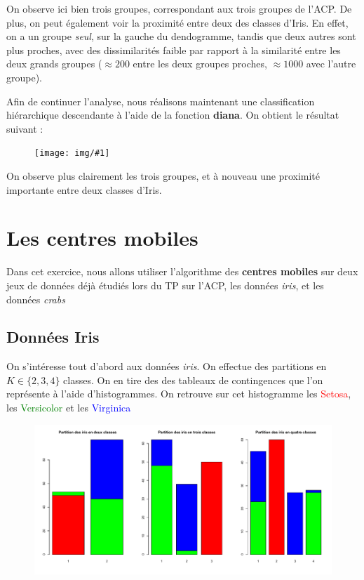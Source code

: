 \documentclass[a4paper,11pt]{article}
\newcommand{\InsertFig}[1]{
\begin{figure}[H]
\begin{center}
\texttt{[image: img/\#1]}
\end{center}
\end{figure}}
\begin{document}
\noindent On observe ici bien trois groupes, correspondant aux trois groupes de l'ACP. De plus, on peut également voir la proximité entre deux des classes d'Iris. En effet,  on a un groupe \textit{seul}, sur la gauche du dendogramme, tandis que deux autres sont plus proches, avec des dissimilarités faible par rapport à la similarité entre les deux grands groupes ($\approx 200$ entre les deux groupes proches, $\approx 1000$ avec l'autre groupe).

\noindent Afin de continuer l'analyse, nous réalisons maintenant une classification hiérarchique descendante à l'aide de la fonction \textbf{diana}. On obtient le résultat suivant : 


\InsertFig{dendodiana}

\noindent On observe plus clairement les trois groupes, et à nouveau une proximité importante entre deux classes d'Iris.

\section{Les centres mobiles}

\noindent Dans cet exercice, nous allons utiliser l'algorithme des \textbf{centres mobiles} sur deux jeux de données déjà étudiés lors du TP sur l'ACP, les données \textit{iris}, et les données \textit{crabs}

\subsection{Données Iris}

\noindent On s'intéresse tout d'abord aux données \textit{iris}. On effectue des partitions en $K \in \{2,3,4\}$ classes. On en tire des des tableaux de contingences que l'on représente à l'aide d'histogrammes. On retrouve sur cet histogramme les \textcolor{red}{Setosa}, les \textcolor{green}{Versicolor} et les \textcolor{blue}{Virginica}

\begin{figure}[H]
\begin{center}
\includegraphics[width=\textwidth]{img/partiris}
\end{center}
\end{figure}
\end{document}
